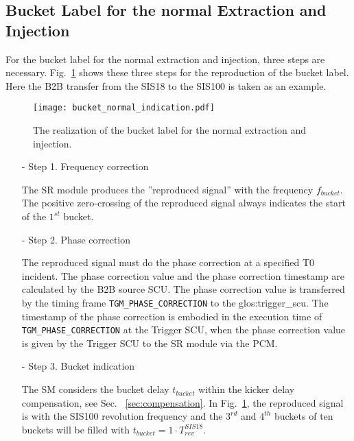 \subsection{Bucket Label for the normal Extraction and Injection}

For the bucket label for the normal extraction and injection, three steps are necessary. Fig.~\ref{bucket_label} shows these three steps for the reproduction of the bucket label. Here the B2B transfer from the SIS18 to the SIS100 is taken as an example.
\begin{figure}[!htb]
   \centering   
   \texttt{[image: bucket\_normal\_indication.pdf]}
   \caption{The realization of the bucket label for the normal extraction and injection.}
   \label{bucket_label}
\end{figure}  
\begin{itemize}
\item[-] Step 1. Frequency correction

The \gls{SR} module produces the ''reproduced signal'' with the frequency $f_{\mathit{bucket}}$. The positive zero-crossing of the reproduced signal always indicates the start of the $1^{st}$ bucket.
\item[-] Step 2. Phase correction

The reproduced signal must do the phase correction at a specified T0 incident. The phase correction value and the phase correction timestamp are calculated by the B2B source SCU. The phase correction value is transferred by the timing frame \verb|TGM_PHASE_CORRECTION| to the \gls{glos:trigger_scu}. The timestamp of the phase correction is embodied in the execution time of \verb|TGM_PHASE_CORRECTION| at the Trigger SCU, when the phase correction value is given by the Trigger SCU to the SR module via the PCM.


\item[-] Step 3. Bucket indication

The SM considers the bucket delay $t_{\mathit{bucket}}$ within the kicker delay compensation, see Sec. ~\ref{sec:compensation}. In Fig.~\ref{bucket_label}, the reproduced signal is with the SIS100 revolution frequency and the $3^{rd}$ and $4^{th}$ buckets of ten buckets will be filled with $t_{\mathit{bucket}}=1\cdot T_{\mathit{rev}}^{\mathit{SIS18}}$. 
\end{itemize}

